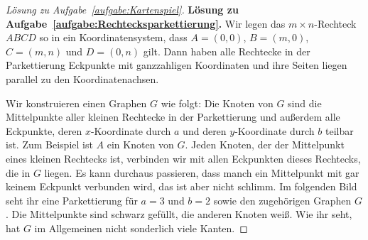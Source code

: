 \begin{proof}[Lösung zu Aufgabe~\ref{aufgabe:Kartenspiel}]
	\textbf{Lösung zu Aufgabe~\ref{aufgabe:Rechtecksparkettierung}.} Wir legen das $m\times n$-Rechteck $ABCD$ so in ein Koordinatensystem, dass $A=(0,0)$, $B=(m,0)$, $C=(m,n)$ und $D=(0,n)$ gilt. %
	Dann haben alle Rechtecke in der Parkettierung Eckpunkte mit ganzzahligen Koordinaten und ihre Seiten liegen parallel zu den Koordinatenachsen. 
	
	Wir konstruieren einen Graphen $G$ wie folgt: Die Knoten von $G$ sind die Mittelpunkte aller kleinen Rechtecke in der Parkettierung und außerdem alle Eckpunkte, deren $x$-Koordinate durch $a$ und deren $y$-Koordinate durch $b$ teilbar ist. Zum Beispiel ist $A$ ein Knoten von $G$. Jeden Knoten, der der Mittelpunkt eines kleinen Rechtecks ist, verbinden wir mit allen Eckpunkten dieses Rechtecks, die in $G$ liegen. Es kann durchaus passieren, dass manch ein Mittelpunkt mit gar keinem Eckpunkt verbunden wird, das ist aber nicht schlimm. Im folgenden Bild seht ihr eine Parkettierung für $a=3$ und $b=2$ sowie den zugehörigen Graphen $G$. Die Mittelpunkte sind schwarz gefüllt, die anderen Knoten weiß. Wie ihr seht, hat $G$ im Allgemeinen nicht sonderlich viele Kanten.
	

\end{proof}
